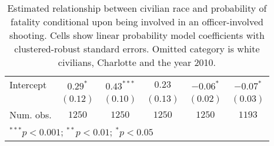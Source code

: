 \begin{table}[ht!]
\begin{center}
\begin{tabular}{l c c c c c}
Intercept                  & $0.29^{*}$  & $0.43^{***}$ & $0.23$      & $-0.06^{*}$  & $-0.07^{*}$  \\
                           & $(0.12)$    & $(0.10)$     & $(0.13)$    & $(0.02)$     & $(0.03)$     \\
\midrule
Num. obs.                  & $1250$      & $1250$       & $1250$      & $1250$       & $1193$       \\
\bottomrule
\multicolumn{6}{l}{\scriptsize{$^{***}p<0.001$; $^{**}p<0.01$; $^{*}p<0.05$}}
\end{tabular}
\caption{Estimated relationship between civilian race and probability of fatality conditional upon being involved in an officer-involved shooting. Cells show linear probability model coefficients with clustered-robust standard errors. Omitted category is white civilians, Charlotte and the year 2010.}
\label{tab:lpm_FE}
\end{center}
\end{table}
